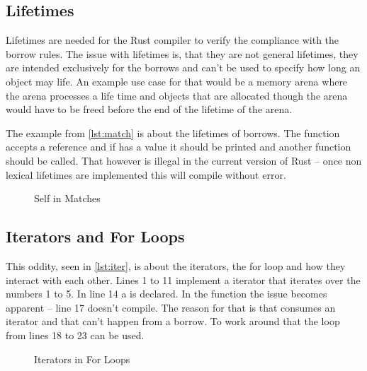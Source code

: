 \documentclass[thesis]{subfiles}
\begin{document}
  \subsection{Lifetimes}
    Lifetimes are needed for the Rust compiler to verify the compliance with the borrow rules.
    The issue with lifetimes is, that they are not general lifetimes, they are intended exclusively for the borrows and can't be used to specify how long an object may life.
    An example use case for that would be a memory arena where the arena processes a life time and objects that are allocated though the arena would have to be freed before the end of the lifetime of the arena.

    The example from \autoref{lst:match} is about the lifetimes of borrows.
    The function \fun accepts a \Foo reference and if  has a value it should be printed and another function should be called.
    That however is illegal in the current version of Rust -- once non lexical lifetimes are implemented this will compile without error.

    \begin{figure}[ht]
      \captionsetup{type=lstlisting}
      
      \caption{Self in Matches}\label{lst:match}
    \end{figure}


  \subsection{Iterators and For Loops}
    This oddity, seen in \autoref{lst:iter}, is about the iterators, the for loop and how they interact with each other.
    Lines 1 to 11 implement a iterator that iterates over the numbers 1 to 5.
    In line 14 a \struct \Foo is declared.
    In the \fun function the issue becomes apparent -- line 17 doesn't compile.
    The reason for that is that \for consumes an iterator and that can't happen from a borrow.
    To work around that the loop from lines 18 to 23 can be used.

    \begin{figure}[ht]
      \captionsetup{type=lstlisting}
      
      \caption{Iterators in For Loops}\label{lst:iter}
    \end{figure}
\end{document}
